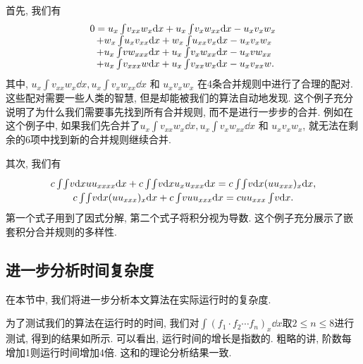 首先, 我们有 
\begin{equation}
\def\arraystretch{1.0}
\begin{array}{l}
0=u_x\int\!{v_{xx}w_x\dd x}+u_x\int\!{v_xw_{xx}\dd x}-u_xv_xw_x\\
~~+w_x\int\!{u_xv_{xx}\dd x}+w_x\int\!{u_{xx}v_x\dd x}-u_xv_xw_x\\
~~+u_x\int\!{vw_{xxx}\dd x}+u_x\int\!{v_xw_{xx}\dd x}-u_xvw_{xx}\\
~~+u_x\int\!{v_{xxx}w\dd x}+u_x\int\!{v_{xx}w_x\dd x}-u_xv_{xx}w.
\end{array}
\label{counter_example}
\end{equation}
其中, $u_x\int\!{v_{xx}w_x\dd x},u_x\int\!{v_xw_{xx}\dd x}$ 和 $u_xv_xw_x$ 在4条合并规则中进行了合理的配对. 这些配对需要一些人类的智慧, 但是却能被我们的算法自动地发现. 这个例子充分说明了为什么我们需要事先找到所有合并规则, 而不是进行一步步的合并. 例如在这个例子中, 如果我们先合并了$u_x\int\!{v_{xx}w_x\dd x},u_x\int\!{v_xw_{xx}\dd x}$ 和 $u_xv_xw_x$, 就无法在剩余的6项中找到新的合并规则继续合并. 

其次, 我们有 
\begin{equation}
\def\arraystretch{1.2}
\begin{array}{c}
c\int\!{\int\!{v\dd x}uu_{xxxx}\dd x}+c\int\!{\int\!{v\dd x}u_xu_{xxx}\dd x}=c\int\!{\int\!{v\dd x}(uu_{xxx})_x\dd x},\\
c\int\!{\int\!{v\dd x}(uu_{xxx})_x\dd x}+c\int\!{vuu_{xxx}\dd x}=cuu_{xxx}\int\!{v\dd x}.
\end{array}
\end{equation} 
第一个式子用到了因式分解, 第二个式子将积分视为导数. 这个例子充分展示了嵌套积分合并规则的多样性. 

\subsection{进一步分析时间复杂度}\label{sec5.2-03}
在本节中, 我们将进一步分析本文算法在实际运行时的复杂度. 

为了测试我们的算法在运行时的时间, 我们对$\int\!{(f_1\cdot f_2\cdots f_n)_x \dd x}$取$2\le n \le 8$进行测试, 得到的结果如所示. 可以看出, 运行时间的增长是指数的. 粗略的讲, 阶数每增加1则运行时间增加4倍. 这和的理论分析结果一致. 

